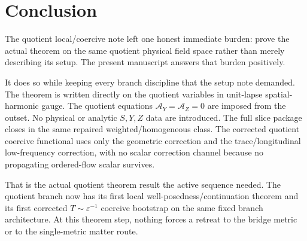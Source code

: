 \documentclass[11pt]{article}
\newcommand{\AY}{\mathcal A_Y}
\newcommand{\AZ}{\mathcal A_Z}
\begin{document}
\section{Conclusion}

The quotient local/coercive note left one honest immediate burden: prove the actual theorem on the same quotient physical field space rather than merely describing its setup. The present manuscript answers that burden positively.

It does so while keeping every branch discipline that the setup note demanded. The theorem is written directly on the quotient variables in unit-lapse spatial-harmonic gauge. The quotient equations \(\AY=\AZ=0\) are imposed from the outset. No physical or analytic \(S,Y,Z\) data are introduced. The full slice package closes in the same repaired weighted/homogeneous class. The corrected quotient coercive functional uses only the geometric correction and the trace/longitudinal low-frequency correction, with no scalar correction channel because no propagating ordered-flow scalar survives.

That is the actual quotient theorem result the active sequence needed. The quotient branch now has its first local well-posedness/continuation theorem and its first corrected \(T\sim\varepsilon^{-1}\) coercive bootstrap on the same fixed branch architecture. At this theorem step, nothing forces a retreat to the bridge metric or to the single-metric matter route.
\end{document}
